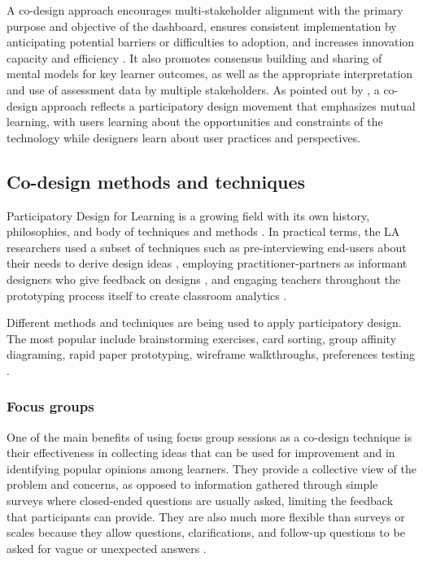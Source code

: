 \documentclass[manuscript,nonacm,12pt]{acmart}
\begin{document}
A co-design approach encourages multi-stakeholder alignment with the primary purpose and objective of the dashboard, ensures consistent implementation by anticipating potential barriers or difficulties to adoption, and increases innovation capacity and efficiency \cite{boscardin2018twelve}. It also promotes consensus building and sharing of mental models for key learner outcomes, as well as the appropriate interpretation and use of assessment data by multiple stakeholders. As pointed out by \citet{schuler1993participatory}, a co-design approach reflects a participatory design movement that emphasizes mutual learning, with users learning about the opportunities and constraints of the technology while designers learn about user practices and perspectives.


\subsection{Co-design methods and techniques}
Participatory Design for Learning is a growing field with its own history, philosophies, and body of techniques and methods \cite{disalvo2017participatory}. In practical terms, the LA researchers used a subset of techniques such as pre-interviewing end-users about 
their needs to derive design ideas \cite{xhakaj2016teachers}, employing practitioner-partners as informant designers who give feedback on 
designs \cite{fiorini2018application}, and engaging teachers throughout the prototyping process itself to create classroom analytics \cite{holstein2018classroom}.

Different methods and techniques are being used to apply participatory design. The most popular include brainstorming exercises, card sorting, group affinity diagraming, rapid paper prototyping, wireframe walkthroughs, preferences testing \cite{abel2013cross}. 

\subsubsection{Focus groups}
One of the main benefits of using focus group sessions as a co-design technique is their effectiveness in collecting ideas that can be used for improvement and in identifying popular opinions among learners.  They provide a collective view of the problem and concerns, as opposed to information gathered through simple surveys where closed-ended questions are usually asked, limiting the feedback that participants can provide. They are also much more flexible than surveys or scales because they allow questions, clarifications, and follow-up questions to be asked for vague or unexpected answers \cite{krueger2014focus}. 
\end{document}
